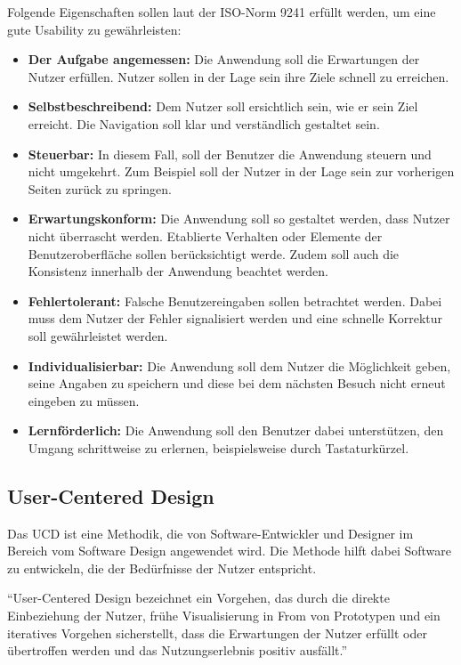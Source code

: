 Folgende Eigenschaften sollen laut der ISO-Norm 9241 \citep{ISO_standard} erfüllt werden, um eine gute Usability zu gewährleisten:

\begin{itemize}
	\item \textbf{Der Aufgabe angemessen:} Die Anwendung soll die Erwartungen der Nutzer erfüllen. Nutzer sollen in der Lage sein ihre Ziele schnell zu erreichen.
	\item \textbf{Selbstbeschreibend:} Dem Nutzer soll ersichtlich sein, wie er sein Ziel erreicht. Die Navigation soll klar und verständlich gestaltet sein.
	\item \textbf{Steuerbar:} In diesem Fall, soll der Benutzer die Anwendung steuern und nicht umgekehrt. Zum Beispiel soll der Nutzer in der Lage sein zur vorherigen Seiten zurück zu springen.
	\item \textbf{Erwartungskonform:} Die Anwendung soll so gestaltet werden, dass Nutzer nicht überrascht werden. Etablierte Verhalten oder Elemente der Benutzeroberfläche sollen berücksichtigt werde. Zudem soll auch die Konsistenz innerhalb der Anwendung beachtet werden.
	\item \textbf{Fehlertolerant:} Falsche Benutzereingaben sollen betrachtet werden. Dabei muss dem Nutzer der Fehler signalisiert werden und eine schnelle Korrektur soll gewährleistet werden.
	\item \textbf{Individualisierbar:} Die Anwendung soll dem Nutzer die Möglichkeit geben, seine Angaben zu speichern und diese bei dem nächsten Besuch nicht erneut eingeben zu müssen.
	\item \textbf{Lernförderlich:} Die Anwendung soll den Benutzer dabei unterstützen, den Umgang schrittweise zu erlernen, beispielsweise durch Tastaturkürzel.
\end{itemize}

\subsection{User-Centered Design}

Das \ac{UCD} ist eine Methodik, die von Software-Entwickler und Designer im Bereich vom Software Design angewendet wird. 
Die Methode hilft dabei Software zu entwickeln, die der Bedürfnisse der Nutzer entspricht. \citep[vgl.]{salinas_2020}

\begin{definition}

\enquote{User-Centered Design bezeichnet ein Vorgehen, das durch die direkte Einbeziehung der Nutzer, frühe Visualisierung in From von Prototypen und ein iteratives Vorgehen sicherstellt, dass die Erwartungen der Nutzer erfüllt oder übertroffen werden und das Nutzungserlebnis positiv ausfällt.} \citep{weichert_quick_2021}

\end{definition} 

